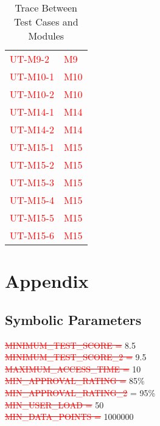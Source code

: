 \documentclass[12pt, titlepage]{article}
\begin{document}
\begin{table}[H]
\begin{tabular}{p{} p{}}
            \textcolor{red}{UT-M9-2} & \textcolor{red}{M9}\\
            \textcolor{red}{UT-M10-1} & \textcolor{red}{M10}\\
            \textcolor{red}{UT-M10-2} & \textcolor{red}{M10}\\
            \textcolor{red}{UT-M14-1} & \textcolor{red}{M14}\\
            \textcolor{red}{UT-M14-2} & \textcolor{red}{M14}\\
            \textcolor{red}{UT-M15-1} & \textcolor{red}{M15}\\
            \textcolor{red}{UT-M15-2} & \textcolor{red}{M15}\\
            \textcolor{red}{UT-M15-3} & \textcolor{red}{M15}\\
            \textcolor{red}{UT-M15-4} & \textcolor{red}{M15}\\
            \textcolor{red}{UT-M15-5} & \textcolor{red}{M15}\\
            \textcolor{red}{UT-M15-6} & \textcolor{red}{M15}\\
		\bottomrule
	\end{tabular}
	\caption{Trace Between Test Cases and Modules}
	\label{TblRT}
\end{table}





\newpage

\section{Appendix}


\subsection{Symbolic Parameters}

\noindent \textcolor{red}{\sout{MINIMUM\_TEST\_SCORE =}}  \hypertarget{MINIMUM_TEST_SCORE}{8.5}\\
\textcolor{red}{\sout{MINIMUM\_TEST\_SCORE\_2 =}} \hypertarget{MINIMUM_TEST_SCORE_2}{9.5}\\
\textcolor{red}{\sout{MAXIMUM\_ACCESS\_TIME =}} \hypertarget{MAXIMUM_ACCESS_TIME}{10}\\
\textcolor{red}{\sout{MIN\_APPROVAL\_RATING =}} \hypertarget{MIN_APPROVAL_RATING}{85\%}\\
\textcolor{red}{\sout{MIN\_APPROVAL\_RATING\_2}} = \hypertarget{MIN_APPROVAL_RATING_2}{95\%}\\
\textcolor{red}{\sout{MIN\_USER\_LOAD =}} \hypertarget{MIN_USER_LOAD}{50}\\
\textcolor{red}{\sout{MIN\_DATA\_POINTS =}} \hypertarget{MIN_DATA_POINTS}{1000000}
\end{document}
